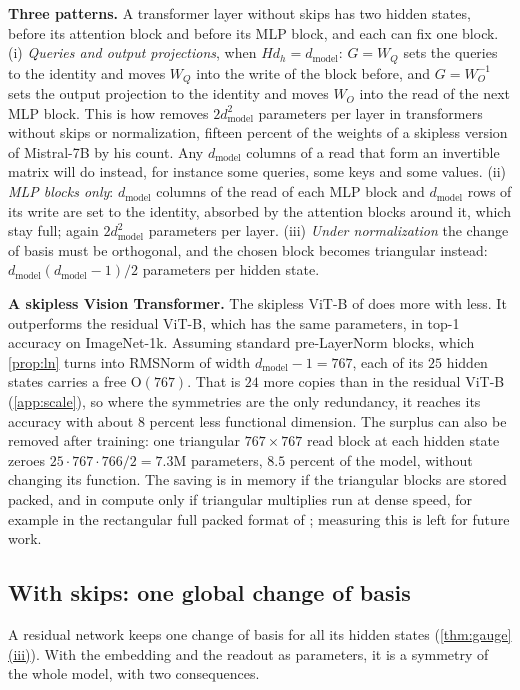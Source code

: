\documentclass[10pt]{article}
\theoremstyle{definition}
\theoremstyle{remark}
\newcommand{\dm}{d_{\mathrm{model}}}
\newcommand{\Ort}{\mathrm{O}}
\newcommand{\para}[1]{\smallskip\noindent\textbf{#1}\hspace{0.5em}}
\DeclareRobustCommand{\cpref}[2]{\hyperref[#1:#2]{\cref*{#1}(#2)}}
\begin{document}
\para{Three patterns.} A transformer layer without skips has two hidden states, before its attention block and before its MLP block, and each can fix one block. (i) \emph{Queries and output projections}, when $Hd_h = \dm$: $G = W_Q$ sets the queries to the identity and moves $W_Q$ into the write of the block before, and $G = W_O^{-1}$ sets the output projection to the identity and moves $W_O$ into the read of the next MLP block. This is how \citet{graef2024tricks} removes $2\dm^2$ parameters per layer in transformers without skips or normalization, fifteen percent of the weights of a skipless version of Mistral-7B by his count. Any $\dm$ columns of a read that form an invertible matrix will do instead, for instance some queries, some keys and some values. (ii) \emph{MLP blocks only}: $\dm$ columns of the read of each MLP block and $\dm$ rows of its write are set to the identity, absorbed by the attention blocks around it, which stay full; again $2\dm^2$ parameters per layer. (iii) \emph{Under normalization} the change of basis must be orthogonal, and the chosen block becomes triangular instead: $\dm(\dm-1)/2$ parameters per hidden state.

\para{A skipless Vision Transformer.} The skipless ViT-B of \citet{ji2026cutting} does more with less. It outperforms the residual ViT-B, which has the same parameters, in top-1 accuracy on ImageNet-1k. Assuming standard pre-LayerNorm blocks, which \cref{prop:ln} turns into RMSNorm of width $\dm - 1 = 767$, each of its $25$ hidden states carries a free $\Ort(767)$. That is $24$ more copies than in the residual ViT-B (\cref{app:scale}), so where the symmetries are the only redundancy, it reaches its accuracy with about $8$ percent less functional dimension. The surplus can also be removed after training: one triangular $767 \times 767$ read block at each hidden state zeroes $25 \cdot 767 \cdot 766/2 = 7.3$M parameters, $8.5$ percent of the model, without changing its function. The saving is in memory if the triangular blocks are stored packed, and in compute only if triangular multiplies run at dense speed, for example in the rectangular full packed format of \citet{gustavson2010rfp}; measuring this is left for future work.

\subsection{With skips: one global change of basis}\label{sec:global}

A residual network keeps one change of basis for all its hidden states (\cpref{thm:gauge}{iii}). With the embedding and the readout as parameters, it is a symmetry of the whole model, with two consequences.
\end{document}
